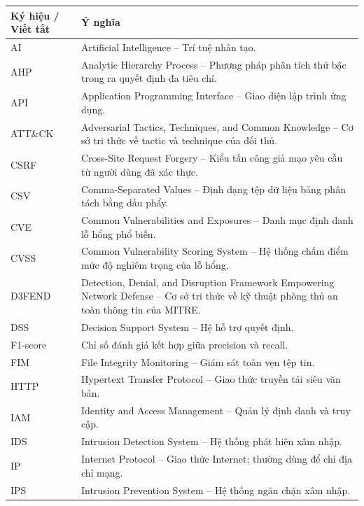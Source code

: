 \documentclass[a4paper,12pt,oneside]{book}
\begin{document}
{}

\vspace{0.5cm}
\fontsize{13pt}{15.6pt}\selectfont

\begin{longtable}{L{3.2cm} L{10.8cm}}
\textbf{Ký hiệu / Viết tắt} & \textbf{Ý nghĩa} \\ 
\hline
\endhead

AI & Artificial Intelligence -- Trí tuệ nhân tạo. \\
AHP & Analytic Hierarchy Process -- Phương pháp phân tích thứ bậc trong ra quyết định đa tiêu chí. \\
API & Application Programming Interface -- Giao diện lập trình ứng dụng. \\
ATT\&CK & Adversarial Tactics, Techniques, and Common Knowledge -- Cơ sở tri thức về tactic và technique của đối thủ. \\
CSRF & Cross-Site Request Forgery -- Kiểu tấn công giả mạo yêu cầu từ người dùng đã xác thực. \\
CSV & Comma-Separated Values -- Định dạng tệp dữ liệu bảng phân tách bằng dấu phẩy. \\
CVE & Common Vulnerabilities and Exposures -- Danh mục định danh lỗ hổng phổ biến. \\
CVSS & Common Vulnerability Scoring System -- Hệ thống chấm điểm mức độ nghiêm trọng của lỗ hổng. \\
D3FEND & Detection, Denial, and Disruption Framework Empowering Network Defense -- Cơ sở tri thức về kỹ thuật phòng thủ an toàn thông tin của MITRE. \\
DSS & Decision Support System -- Hệ hỗ trợ quyết định. \\
F1-score & Chỉ số đánh giá kết hợp giữa precision và recall. \\
FIM & File Integrity Monitoring -- Giám sát toàn vẹn tệp tin. \\
HTTP & Hypertext Transfer Protocol -- Giao thức truyền tải siêu văn bản. \\
IAM & Identity and Access Management -- Quản lý định danh và truy cập. \\
IDS & Intrusion Detection System -- Hệ thống phát hiện xâm nhập. \\
IP & Internet Protocol -- Giao thức Internet; thường dùng để chỉ địa chỉ mạng. \\
IPS & Intrusion Prevention System -- Hệ thống ngăn chặn xâm nhập. \\

\end{longtable}
\end{document}

